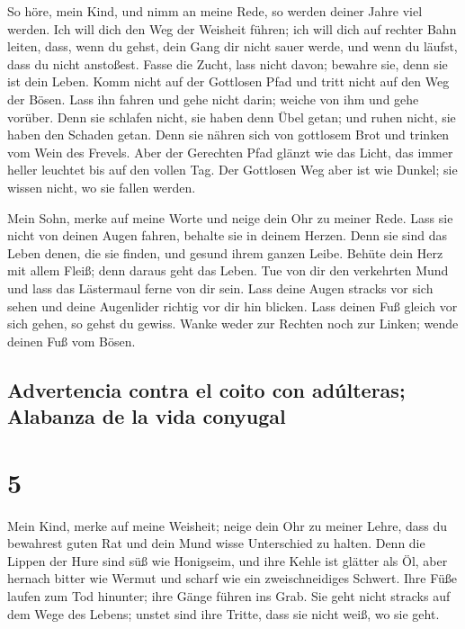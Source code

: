  So höre, mein Kind, und nimm an meine Rede, so werden
deiner Jahre viel werden.  Ich will dich den Weg der
Weisheit führen; ich will dich auf rechter Bahn leiten, 
dass, wenn du gehst, dein Gang dir nicht sauer werde, und wenn du
läufst, dass du nicht anstoßest.  Fasse die Zucht, lass
nicht davon; bewahre sie, denn sie ist dein Leben.  Komm
nicht auf der Gottlosen Pfad und tritt nicht auf den Weg der Bösen.
 Lass ihn fahren und gehe nicht darin; weiche von ihm und
gehe vorüber.  Denn sie schlafen nicht, sie haben denn
Übel getan; und ruhen nicht, sie haben den Schaden getan.
 Denn sie nähren sich von gottlosem Brot und trinken vom
Wein des Frevels.  Aber der Gerechten Pfad glänzt wie das
Licht, das immer heller leuchtet bis auf den vollen Tag. 
Der Gottlosen Weg aber ist wie Dunkel; sie wissen nicht, wo sie fallen
werden.

 Mein Sohn, merke auf meine Worte und neige dein Ohr zu
meiner Rede.  Lass sie nicht von deinen Augen fahren,
behalte sie in deinem Herzen.  Denn sie sind das Leben
denen, die sie finden, und gesund ihrem ganzen Leibe. 
Behüte dein Herz mit allem Fleiß; denn daraus geht das Leben.
 Tue von dir den verkehrten Mund und lass das Lästermaul
ferne von dir sein.  Lass deine Augen stracks vor sich
sehen und deine Augenlider richtig vor dir hin blicken. 
Lass deinen Fuß gleich vor sich gehen, so gehst du gewiss.
 Wanke weder zur Rechten noch zur Linken; wende deinen
Fuß vom Bösen.

\hypertarget{advertencia-contra-el-coito-con-aduxfalteras-alabanza-de-la-vida-conyugal}{%
\subsection{Advertencia contra el coito con adúlteras; Alabanza de la
vida
conyugal}\label{advertencia-contra-el-coito-con-aduxfalteras-alabanza-de-la-vida-conyugal}}

\hypertarget{section-4}{%
\section{5}\label{section-4}}

 Mein Kind, merke auf meine Weisheit; neige dein Ohr zu
meiner Lehre,  dass du bewahrest guten Rat und dein Mund
wisse Unterschied zu halten.  Denn die Lippen der Hure
sind süß wie Honigseim, und ihre Kehle ist glätter als Öl,
 aber hernach bitter wie Wermut und scharf wie ein
zweischneidiges Schwert.  Ihre Füße laufen zum Tod
hinunter; ihre Gänge führen ins Grab.  Sie geht nicht
stracks auf dem Wege des Lebens; unstet sind ihre Tritte, dass sie nicht
weiß, wo sie geht.

